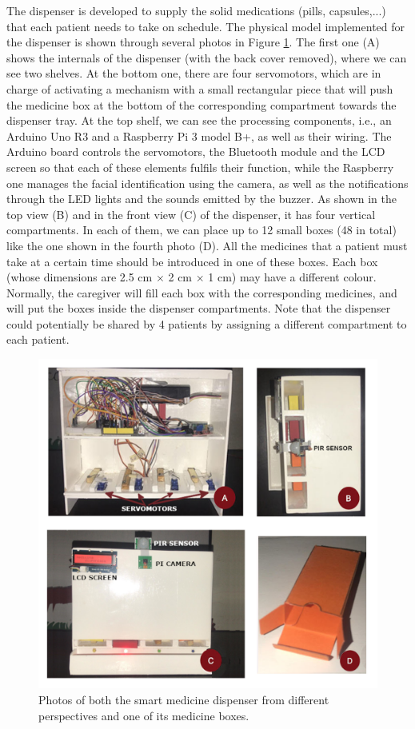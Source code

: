 \documentclass{IOS-Book-Article}
\begin{document}
The dispenser is developed to supply the solid medications (pills, capsules,...) that each patient needs to take on schedule. The physical model implemented for the dispenser is shown through several photos in Figure \ref{figures:Dispenser}. The first one (A) shows the internals of the dispenser (with the back cover removed), where we can see two shelves. At the bottom one, there are four servomotors, which are in charge of activating a mechanism with a small rectangular piece that will push the medicine box at the bottom of the corresponding compartment towards the dispenser tray. At the top shelf, we can see the processing components, i.e., an Arduino Uno R3 and a Raspberry Pi 3 model B+, as well as their wiring. The Arduino board controls the servomotors, the Bluetooth module and the LCD screen so that each of these elements fulfils their function, while the Raspberry one manages the facial identification using the camera, as well as the notifications through the LED lights and the sounds emitted by the buzzer. As shown in the top view (B) and in the front view (C) of the dispenser, it has four vertical compartments. In each of them, we can place up to 12 small boxes (48 in total) like the one shown in the fourth photo (D). All the medicines that a patient must take at a certain time should be introduced in one of these boxes. Each box (whose dimensions are 2.5 cm $\times$ 2 cm $\times$ 1 cm) may have a different colour. Normally, the caregiver will fill each box with the corresponding medicines, and will put the boxes inside the dispenser compartments. Note that the dispenser could potentially be shared by 4 patients by assigning a different compartment to each patient.

\begin{figure}[htb]
	\centering\includegraphics{DispenserViewFinal.png}
	\caption{Photos of both the smart medicine dispenser from different perspectives and one of its medicine boxes.}
	\label{figures:Dispenser}
\end{figure}
\end{document}
